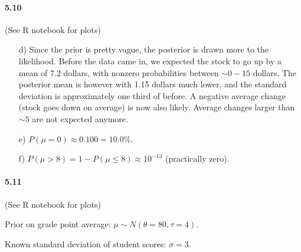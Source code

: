 \documentclass[fontsize=11pt,DIV=18,parskip=half]{scrartcl}
\begin{document}
\paragraph{5.10} (See R notebook for plots)
\begin{enumerate}
\item[d)] Since the prior is pretty vague, the posterior is drawn more to the likelihood. Before the data came in, we expected the stock to go up by a mean of 7.2 dollars, with nonzero probabilities between $\sim0-15$ dollars. The posterior mean is however with 1.15 dollars much lower, and the standard deviation is approximately one third of before. A negative average change (stock goes down on average) is now also likely. Average changes larger than $\sim5$ are not expected anymore.
\item[e)] $P(\mu=0) \approx 0.100 = 10.0\%$.
\item[f)] $P(\mu > 8) = 1 - P(\mu \leq 8) \approx 10^{-13}$ (practically zero).
\end{enumerate}

\paragraph{5.11} (See R notebook for plots)

Prior on grade point average: $\mu \sim  N( \theta=80, \tau=4)$.

Known standard deviation of student scores: $\sigma=3$.
\end{document}
